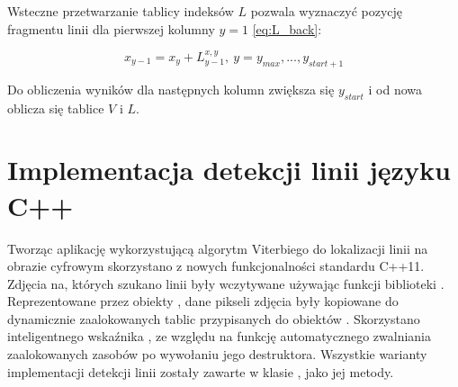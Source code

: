 \documentclass[document.tex]{subfiles}
\begin{document}
Wsteczne przetwarzanie tablicy indeksów $L$ pozwala wyznaczyć pozycję fragmentu linii dla pierwszej kolumny $y = 1$ \ref{eq:L_back}:

\begin{equation}
   x_{y-1} = x_y + L_{y-1}^{x,y},\ y = y_{max},...,y_{start + 1}
    \label{eq:L_back}
\end{equation}

Do obliczenia wyników dla następnych kolumn zwiększa się $y_{start}$ i od nowa oblicza się tablice $V$ i $L$.
\section{Implementacja detekcji linii języku C++}
\indent Tworząc aplikację wykorzystującą algorytm Viterbiego do lokalizacji linii
na obrazie cyfrowym skorzystano z nowych funkcjonalności standardu C++11. 
Zdjęcia na, których szukano linii były wczytywane używając funkcji biblioteki
. Reprezentowane przez obiekty , dane pikseli zdjęcia były kopiowane do
dynamicznie zaalokowanych tablic przypisanych do obiektów . Skorzystano inteligentnego wskaźnika  , ze względu na funkcję automatycznego zwalniania zaalokowanych zasobów po wywołaniu jego destruktora.  
Wszystkie warianty implementacji detekcji linii zostały zawarte w klasie , 
jako jej metody. 

\end{document}

